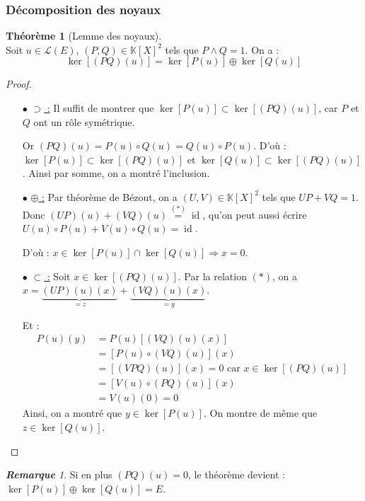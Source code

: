 \documentclass[12pt]{book}
\let\ensembleNombre\mathbb
\newcommand*\K{\ensuremath{\ensembleNombre{K}}}
\DeclareMathOperator{\id}{id}
\theoremstyle{definition}
\newtheorem{thme}{Théorème}[chapter]
\theoremstyle{remark}
\newtheorem*{rem}{\textbf{Remarque}}
\newenvironment{fthme}
  {\begin{mdframed}[roundcorner=10pt, linewidth=2pt]\begin{thme}}
  {\end{thme}\end{mdframed}}
\begin{document}
		\subsubsection{Décomposition des noyaux}
	\begin{fthme}[Lemme des noyaux] \mbox{~}\\
	Soit $u \in \mathcal L(E)$, $(P,Q) \in \K[X]^2$ tels que $P \wedge Q = 1$. On a :
	\[ \boxed{\ker \left [(PQ)(u) \right] = \ker \left[P(u) \right] \oplus \ker \left[Q(u) \right] }\]
	\end{fthme}
	\begin{proof} \mbox{~}\\
		\begin{itemize}
		\item[$\bullet$ \underline{$\supset$ :}] Il suffit de montrer que $\ker [P(u)] \subset \ker [(PQ)(u)]$, car $P$ et $Q$ ont un rôle symétrique.
		
		Or $(PQ)(u) = P(u) \circ Q(u) = Q(u) \circ P(u)$. D'où : $\ker [P(u)] \subset \ker [(PQ)(u)]$ et $\ker [Q(u)] \subset \ker [(PQ)(u)]$. Ainsi par somme, on a montré l'inclusion.
		
		\item[$\bullet$ \underline{$\oplus$ :}] Par théorème de Bézout, on a $(U,V) \in \K[X]^2$ tels que $UP + VQ = 1$. Donc $(UP)(u) + (VQ)(u) \overset{(*)}{=} \id$, qu'on peut aussi écrire $U(u) \circ P(u) + V(u) \circ Q(u) = \id$. 
		
		D'où : $x \in \ker [P(u)] \cap \ker [Q(u)] \Longrightarrow x = 0$.
		
		\item[$\bullet$ \underline{$\subset$ :}] Soit $x \in \ker [(PQ)(u)]$. Par la relation $(*)$, on a $x = \underbrace{(UP)(u)(x)}_ {=z} + \underbrace{(VQ)(u)(x)}_{=y}$. 
		
		Et : 
		\begin{align*}
		P(u)(y) &= P(u) [(VQ)(u)(x)] \\
		&= [P(u) \circ (VQ)(u)](x) \\
		&= [(VPQ)(u)](x) = 0 \text{ car } x \in \ker [(PQ)(u)]\\
		&= [V(u) \circ (PQ)(u)](x) \\
		&= V(u)(0) = 0
		\end{align*}
		Ainsi, on a montré que $y \in \ker[P(u)]$. On montre de même que $z \in \ker [Q(u)]$. \qedhere
		\end{itemize}
	\end{proof}
	
	\begin{rem}
	Si en plus $(PQ)(u) = 0$, le théorème devient : $\ker [P(u)] \oplus \ker [Q(u)] = E$.
	\end{rem}
	
\end{document}
